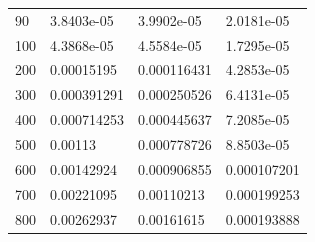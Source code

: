 \begin{center}
\begin{longtable}{l|l|l|l}
90                                                     & 3.8403e-05                                                        & 3.9902e-05                                               & 2.0181e-05                                                         \\
100                                                    & 4.3868e-05                                                        & 4.5584e-05                                               & 1.7295e-05                                                         \\
200                                                    & 0.00015195                                                        & 0.000116431                                              & 4.2853e-05                                                         \\
300                                                    & 0.000391291                                                       & 0.000250526                                              & 6.4131e-05                                                         \\
400                                                    & 0.000714253                                                       & 0.000445637                                              & 7.2085e-05                                                         \\
500                                                    & 0.00113                                                           & 0.000778726                                              & 8.8503e-05                                                         \\
600                                                    & 0.00142924                                                        & 0.000906855                                              & 0.000107201                                                        \\
700                                                    & 0.00221095                                                        & 0.00110213                                               & 0.000199253                                                        \\
800                                                    & 0.00262937                                                        & 0.00161615                                               & 0.000193888                                                        \\

\end{longtable}
\end{center}
